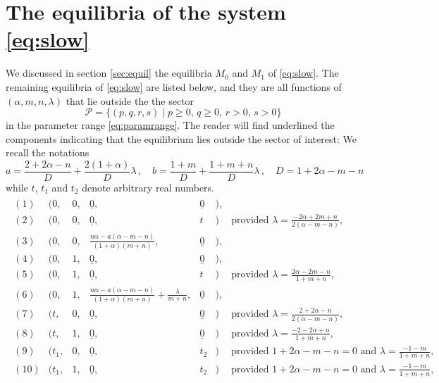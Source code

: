 \documentclass[11pt]{article}
\theoremstyle{remark}
\begin{document}
\section{The equilibria of the system \eqref{eq:slow} }\label{append:equi_reject}
We discussed in section \ref{sec:equil} the equilibria $M_0$ and $M_1$ of \eqref{eq:slow}.
The remaining equilibria of \eqref{eq:slow} are listed below, and they are  all functions of $(\alpha,m,n,\lambda)$ that
lie outside the the sector
$$
\mathcal{P} = \{(p,q,r,s) \; | \; p\ge0, \,  q\ge0, \,  r>0, \, s>0 \}
$$
in the parameter range \eqref{eq:paramrange}.
The reader will find underlined  the components indicating that the equilibrium lies outside the sector of interest:
We recall  the notations
$$
a=\frac{2+2\alpha-n}{D} + \frac{2(1 + \alpha)}{D}\lambda \, , \quad
b=\frac{1+m}{D} + \frac{1+m+n}{D}\lambda \, , \quad
D=1+2\alpha-m-n
$$
while  $t$, $t_1$ and $t_2$ denote arbitrary real numbers.
\allowdisplaybreaks
\begin{align*}
 \begin{array}{lllllll}
  (1) &\Big(0,&0,& \underline{0},&\underline{0}&\Big), \\%
  (2) &\Big(0,&0,& \underline{0},&t&            \Big) &\text{provided } \lambda = \frac{-2\alpha+2m+n}{2(\alpha-m-n)},\\
  (3) &\Big(0,&0,& \frac{n\alpha - a(\alpha-m-n)}{(1+\alpha)(m+n)}, &\underline{0}&\Big),\\
  (4) &\Big(0,&1,& \underline{0},&\underline{0}&\Big), \\
  (5) &\Big(0,&1,& \underline{0},&t&           \Big) &\text{provided } \lambda = \frac{2\alpha-2m-n}{1+m+n},\\
  (6) &\Big(0,&1,& \frac{n\alpha - a(\alpha-m-n)}{(1+\alpha)(m+n)}+\frac{\lambda}{m+n}, &\underline{0}&\Big),\\
  (7) &\Big(t,&0,& \underline{0},&\underline{0}&\Big) &\text{provided } \lambda=\frac{2+2\alpha-n}{2(\alpha-m-n)}, \\
  (8) &\Big(t,&1,& \underline{0},&\underline{0}&\Big) &\text{provided } \lambda=\frac{-2-2\alpha+n}{1+m+n}, \\
  (9) &\Big(t_1,&0,& \underline{0},&t_2&           \Big) &\text{provided $1+2\alpha-m-n=0$ and $\lambda=\frac{-1-m}{1+m+n}$}, \\
 (10) &\Big(t_1,&1,& \underline{0},&t_2&           \Big) &\text{provided $1+2\alpha-m-n=0$ and $\lambda=\frac{-1-m}{1+m+n}$}, \\
 \end{array}
\end{align*}
\end{document}
